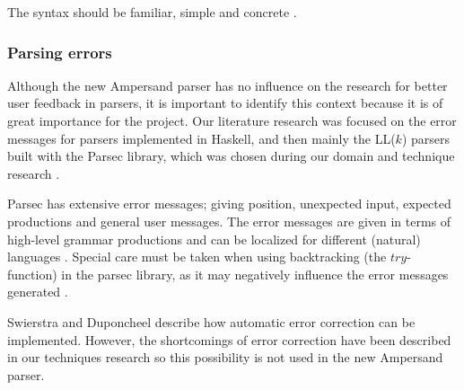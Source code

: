 The syntax should be familiar, simple and concrete .

\subsubsection{Parsing errors}
Although the new Ampersand parser has no influence on the research for better user feedback in parsers, it is important to identify this context because it is of great importance for the project.
Our literature research was focused on the error messages for parsers implemented in Haskell, and then mainly the LL($k$) parsers built with the Parsec library, which was chosen during our domain and technique research .

Parsec has extensive error messages; giving position, unexpected input, expected productions and general user messages.
The error messages are given in terms of high-level grammar productions and can be localized for different (natural) languages .
Special care must be taken when using backtracking (the $try$-function) in the parsec library, as it may negatively influence the error messages generated  .

Swierstra and Duponcheel  describe how automatic error correction can be implemented.
However, the shortcomings of error correction have been described in our techniques research \cite{parsing} so this possibility is not used in the new Ampersand parser.












